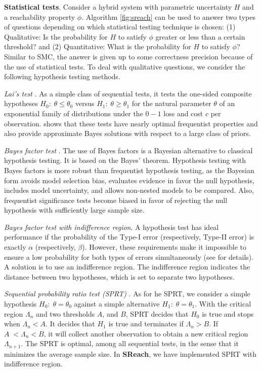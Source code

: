 {\bf Statistical tests}.
Consider a hybrid system with parametric uncertainty $H$ and a reachability property $\phi$. Algorithm \ref{fig:sreach} can be used to answer two types of questions depending on which statistical testing technique is chosen: (1) Qualitative: Is the probability for $H$ to satisfy $\phi$ greater or less than a certain threshold? and
(2) Quantitative: What is the probability for $H$ to satisfy $\phi$? Similar to SMC, the answer is given up to some correctness precision because of the use of statistical tests.  To deal with qualitative questions, we consider the following hypothesis testing methods.

\textit{Lai's test} \cite{lai1988nearly}.
As a simple class of sequential tests, it tests the one-sided composite hypotheses $H_0: \; \theta \leq \theta_0$ versus $H_1:\; \theta \geq \theta_1$ for the natural parameter $\theta$ of an exponential family of distributions under the $0-1$ loss and cost $c$ per observation. \cite{lai1988nearly} shows that these tests have nearly optimal frequentist properties and also provide approximate Bayes solutions with respect to a large class of priors. 

\textit{Bayes factor test} \cite{kass1995bayes}.
The use of Bayes factors is a Bayesian alternative to classical hypothesis testing. It is based on the Bayes' theorem. Hypothesis testing with Bayes factors is more robust than frequentist hypothesis testing, as the Bayesian form avoids model selection bias, evaluates evidence in favor the null hypothesis, includes model uncertainty, and allows non-nested models to be compared. Also, frequentist significance tests become biased in favor of rejecting the null hypothesis with sufficiently large sample size. 

\textit{Bayes factor test with indifference region}. 
A hypothesis test has ideal performance if the probability of the Type-I error (respectively, Type-II error) is exactly $\alpha$ (respectively, $\beta$). However, these requirements make it impossible to ensure a low probability for both types of errors simultaneously (see \cite{younes2005verification} for details). A solution is to use an indifference region. The indifference region indicates the distance between two hypotheses, which is set to separate two hypotheses.

\textit{Sequential probability ratio test (SPRT)} \cite{wald1945sequential}. 
As for he SPRT, we consider a simple hypothesis $H_0:\;\theta = \theta_0$ against a simple alternative $H_1:\;\theta = \theta_1$. With the critical region $\Lambda_n$ and two thresholds $A$, and $B$, SPRT decides that $H_0$ is true and stops when $\Lambda_n < A$. It decides that $H_1$ is true and terminates if $\Lambda_n > B$. If $A\; < \Lambda_n < B$, it will collect another observation to obtain a new critical region $\Lambda_{n+1}$. The SPRT is optimal, among all sequential tests, in the sense that it minimizes the average sample size. In {\bf SReach}, we have implemented SPRT with indifference region.

